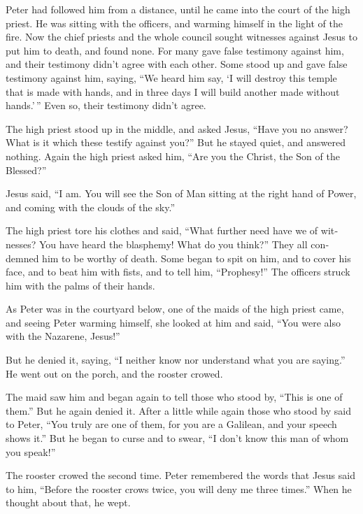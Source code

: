 \begin{paracol}{2}
\begin{otherlanguage}{english}
 Peter had followed him from a distance, until he came
into the court of the high priest. He was sitting with the officers, and
warming himself in the light of the fire.  Now the chief
priests and the whole council sought witnesses against Jesus to put him
to death, and found none.  For many gave false testimony
against him, and their testimony didn't agree with each other.
 Some stood up and gave false testimony against him,
saying,  ``We heard him say, `I will destroy this temple
that is made with hands, and in three days I will build another made
without hands.'\,''  Even so, their testimony didn't
agree.

 The high priest stood up in the middle, and asked Jesus,
``Have you no answer? What is it which these testify against you?''
 But he stayed quiet, and answered nothing. Again the
high priest asked him, ``Are you the Christ, the Son of the Blessed?''

 Jesus said, ``I am. You will see the Son of Man sitting
at the right hand of Power, and coming with the clouds of the sky.''

 The high priest tore his clothes and said, ``What
further need have we of witnesses?  You have heard the
blasphemy! What do you think?'' They all condemned him to be worthy of
death.  Some began to spit on him, and to cover his face,
and to beat him with fists, and to tell him, ``Prophesy!'' The officers
struck him with the palms of their hands.

 As Peter was in the courtyard below, one of the maids of
the high priest came,  and seeing Peter warming himself,
she looked at him and said, ``You were also with the Nazarene, Jesus!''

 But he denied it, saying, ``I neither know nor
understand what you are saying.'' He went out on the porch, and the
rooster crowed.

 The maid saw him and began again to tell those who stood
by, ``This is one of them.''  But he again denied it.
After a little while again those who stood by said to Peter, ``You truly
are one of them, for you are a Galilean, and your speech shows it.''
 But he began to curse and to swear, ``I don't know this
man of whom you speak!''

 The rooster crowed the second time. Peter remembered the
words that Jesus said to him, ``Before the rooster crows twice, you will
deny me three times.'' When he thought about that, he wept.


\end{otherlanguage}
\end{paracol}
